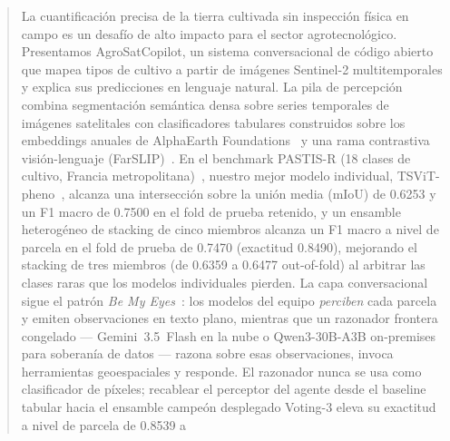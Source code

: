 \begin{abstract}
La cuantificación precisa de la tierra cultivada sin inspección física
en campo es un desafío de alto impacto para el sector agrotecnológico.
Presentamos AgroSatCopilot, un sistema conversacional de código abierto
que mapea tipos de cultivo a partir de imágenes Sentinel-2
multitemporales y explica sus predicciones en lenguaje natural. La pila
de percepción combina segmentación semántica densa sobre series
temporales de imágenes satelitales con clasificadores tabulares
construidos sobre los embeddings anuales de AlphaEarth
Foundations~\cite{brown2025alphaearth} y una rama contrastiva
visión-lenguaje (FarSLIP)~\cite{li2025farslip}. En el benchmark PASTIS-R
(18 clases de cultivo, Francia
metropolitana)~\cite{garnot2021pastis}, nuestro mejor modelo individual,
TSViT-pheno~\cite{tarasiou2023tsvit}, alcanza una intersección sobre la
unión media (mIoU) de 0.6253 y un F1 macro de 0.7500 en el fold de
prueba retenido, y un ensamble heterogéneo de stacking de cinco miembros
alcanza un F1 macro a nivel de parcela en el fold de prueba de 0.7470
(exactitud 0.8490), mejorando el stacking de tres miembros (de 0.6359 a
0.6477 out-of-fold) al arbitrar las clases raras que los modelos
individuales pierden.
La capa conversacional sigue el
patrón \emph{Be My Eyes}~\cite{huang2025bemyeyes}: los modelos del equipo
\emph{perciben} cada parcela y emiten observaciones en texto plano,
mientras que un razonador frontera congelado --- Gemini~3.5~Flash en la
nube o Qwen3-30B-A3B on-premises para soberanía de datos --- razona
sobre esas observaciones, invoca herramientas geoespaciales y responde.
El razonador nunca se usa como clasificador de píxeles; recablear el
perceptor del agente desde el baseline tabular hacia el ensamble campeón
desplegado Voting-3 eleva su exactitud a nivel de parcela de 0.8539 a

\end{abstract}
